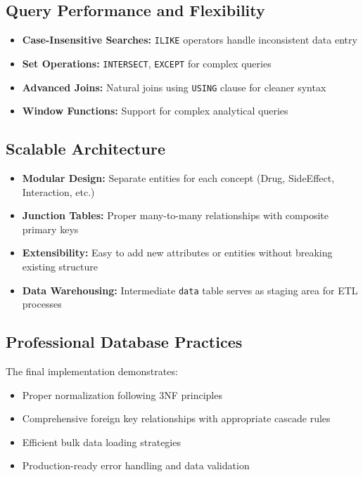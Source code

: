 \documentclass[12pt,a4paper]{article}
\begin{document}
\subsection{Query Performance and Flexibility}
\begin{itemize}
    \item \textbf{Case-Insensitive Searches:} \texttt{ILIKE} operators handle inconsistent data entry
    \item \textbf{Set Operations:} \texttt{INTERSECT}, \texttt{EXCEPT} for complex queries
    \item \textbf{Advanced Joins:} Natural joins using \texttt{USING} clause for cleaner syntax
    \item \textbf{Window Functions:} Support for complex analytical queries
\end{itemize}

\subsection{Scalable Architecture}
\begin{itemize}
    \item \textbf{Modular Design:} Separate entities for each concept (Drug, SideEffect, Interaction, etc.)
    \item \textbf{Junction Tables:} Proper many-to-many relationships with composite primary keys
    \item \textbf{Extensibility:} Easy to add new attributes or entities without breaking existing structure
    \item \textbf{Data Warehousing:} Intermediate \texttt{data} table serves as staging area for ETL processes
\end{itemize}

\subsection{Professional Database Practices}
The final implementation demonstrates:
\begin{itemize}
    \item Proper normalization following 3NF principles
    \item Comprehensive foreign key relationships with appropriate cascade rules
    \item Efficient bulk data loading strategies
    \item Production-ready error handling and data validation
\end{itemize}
\end{document}
